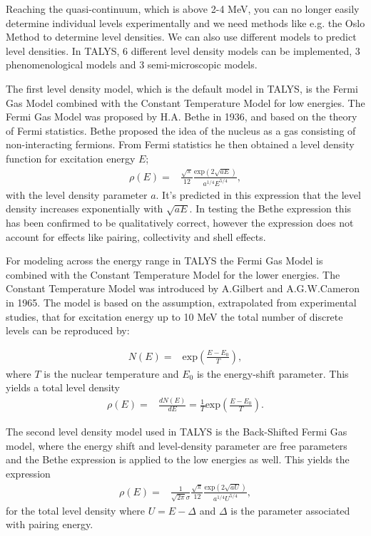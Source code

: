 \documentclass[a4paper,english]{article}
\begin{document}
Reaching the quasi-continuum, which is above 2-4 MeV, you can no longer easily determine individual levels experimentally and we need methods like e.g. the Oslo Method \cite{Schiller2000} to determine level densities. We can also use different models to predict level densities. In TALYS, 6 different level density models can be implemented, 3 phenomenological models and 3 semi-microscopic models.  

The first level density model, which is the default model in TALYS, is the Fermi Gas Model combined with the Constant Temperature Model for low energies. The Fermi Gas Model was proposed by H.A. Bethe in 1936\cite{Bethe1936}, and based on the theory of Fermi statistics. Bethe proposed the idea of the nucleus as a gas consisting of non-interacting fermions. From Fermi statistics he then obtained a level density function for excitation energy $E$;
\begin{align*}
\rho{(E)} =& \frac{\sqrt{\pi}}{12}\frac{\mathrm{exp}(2\sqrt{aE})}{a^{1/4}E^{5/4}},
\end{align*} 
with the level density parameter $a$. It's predicted in this expression that the level density increases exponentially with $\sqrt{aE}$. In testing the Bethe expression this has been confirmed to be qualitatively correct, however the expression does not account for effects like pairing, collectivity and shell effects.

For modeling across the energy range in TALYS the Fermi Gas Model is combined with the Constant Temperature Model for the lower energies. The Constant Temperature Model was introduced by A.Gilbert and A.G.W.Cameron in 1965\cite{Gilbert1965}. The model is based on the assumption, extrapolated from experimental studies, that for excitation energy up to 10 MeV the total number of discrete levels can be reproduced by:

\begin{align*}
N(E) =& \mathrm{exp}(\frac{E-E_{0}}{T}),
\end{align*} 
where $T$ is the nuclear temperature and $E_0$ is the energy-shift parameter. This yields a total level density
\begin{align*}
\rho{(E)} =& \frac{dN(E)}{dE} = \frac{1}{T}\mathrm{exp}(\frac{E-E_{0}}{T}).
\end{align*} 

The second level density model used in TALYS is the Back-Shifted Fermi Gas model\cite{Dilg1973}, where the energy shift and level-density parameter are free parameters and the Bethe expression is applied to the low energies as well. This yields the expression
\begin{align*}
\rho{(E)} =& \frac{1}{\sqrt{2\pi}\sigma}\frac{\sqrt{\pi}}{12}\frac{\mathrm{exp}(2\sqrt{aU})}{a^{1/4}U^{5/4}},
\end{align*} 
for the total level density where $U=E-\Delta$ and $\Delta$ is the parameter associated with pairing energy. 
\end{document}
